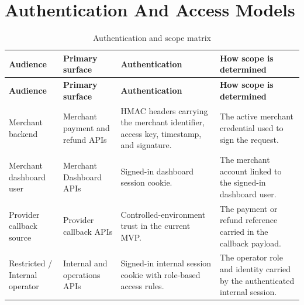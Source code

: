 \section{Authentication And Access Models}

\begin{longtable}{@{}L{0.21\textwidth}L{0.23\textwidth}L{0.22\textwidth}L{0.26\textwidth}@{}}
\caption{Authentication and scope matrix}\\
\toprule
\textbf{Audience} & \textbf{Primary surface} & \textbf{Authentication} &
\textbf{How scope is determined} \\
\midrule
\endfirsthead
\toprule
\textbf{Audience} & \textbf{Primary surface} & \textbf{Authentication} &
\textbf{How scope is determined} \\
\midrule
\endhead
Merchant backend & Merchant payment and refund APIs & HMAC headers carrying the
merchant identifier, access key, timestamp, and signature. & The active
merchant credential used to sign the request. \\
\bodyrowrule
Merchant dashboard user & Merchant Dashboard APIs & Signed-in dashboard session
cookie. & The merchant account linked to the signed-in dashboard user. \\
\bodyrowrule
Provider callback source & Provider callback APIs & Controlled-environment
trust in the current MVP. & The payment or refund reference carried in the
callback payload. \\
\bodyrowrule
Restricted / Internal operator & Internal and operations APIs & Signed-in
internal session cookie with role-based access rules. & The operator role and
identity carried by the authenticated internal session. \\
\bottomrule
\end{longtable}

